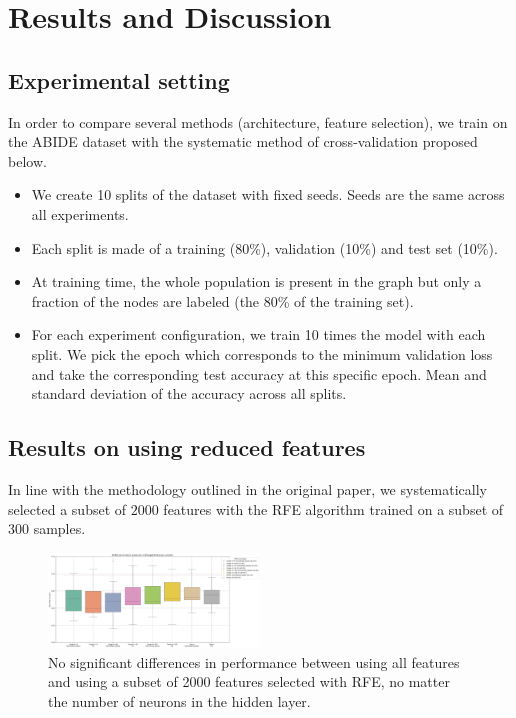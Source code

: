 \section{Results and Discussion}



\subsection{Experimental setting}
In order to compare several methods (architecture, feature selection), we train on the ABIDE dataset with the systematic method of cross-validation proposed below.
\begin{itemize}
	\item We create 10 splits of the dataset with fixed seeds. Seeds are the same across all experiments.
	\item Each split is made of a training (80\%), validation (10\%) and test set (10\%).
	\item At training time, the whole population is present in the graph but only a fraction of the nodes are labeled (the 80\% of the training set).
	\item For each experiment configuration, we train 10 times the model with each split.
	We pick the epoch which corresponds to the minimum validation loss and take the corresponding test accuracy at this specific epoch. Mean and standard deviation of the accuracy across all splits.
\end{itemize}


\subsection{Results on using reduced features}

In line with the methodology outlined in the original paper, we systematically selected a subset of $2000$ features with the RFE algorithm trained on a subset of 300 samples.

\begin{figure}[h!]
    \centering
    \includegraphics[width=0.5\textwidth]{figures/performances_fully_connected_RFE.png}
    \caption{No significant differences in performance between using all features and using a subset of 2000 features selected with RFE, no matter the number of neurons in the hidden layer.}
    \Description{}
    \label{fig:results_feature_reduction}
\end{figure}

